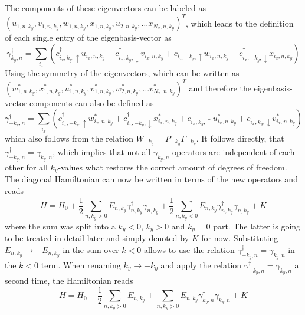The components of these eigenvectors can be labeled as $\left( u_{1,n,k_y}, v_{1,n,k_y}, w_{1,n,k_y}, x_{1,n,k_y}, u_{2,n,k_y}, \hdots x_{N_x,n,k_y}\right)^T$, which leads to the definition of each single entry of the eigenbasis-vector as
\begin{equation}
    \gamma^{\dag}_{k_y,n} = \sum_{i_x} \left( c^{\dag}_{i_x,k_y,\uparrow} u_{i_x,n,k_y} + c^{\dag}_{i_x,k_y,\downarrow}v_{i_x,n,k_y} + c_{i_x,-k_y,\uparrow} w_{i_x,n,k_y} + c^{\dag}_{i_x,-k_y,\downarrow} x_{i_x,n,k_y}\right)
\end{equation}
Using the symmetry of the eigenvectors, which can be written as \\ $\left( w^*_{1,n,k_y}, x^*_{1,n,k_y}, u^*_{1,n,k_y}, v^*_{1,n,k_y}, w^*_{2,n,k_y}, \hdots v^*_{N_x,n,k_y}\right)^T$ and therefore the eigenbasis-vector components can also be defined as 
\begin{equation}
    \gamma^{\dag}_{-k_y,n} = \sum_{i_x} \left( c^{\dag}_{i_x,-k_y,\uparrow} w^*_{i_x,n,k_y} + c^{\dag}_{i_x,-k_y,\downarrow} x^*_{i_x,n,k_y} + c_{i_x,k_y,\uparrow} u^*_{i_x,n,k_y} + c_{i_x,k_y,\downarrow} v^*_{i_x,n,k_y}\right) 
\end{equation}
which also follows from the relation $W_{-k_y} = P_{-k_y}\Gamma_{-k_y}$.
It follows directly, that $\gamma^{\dag}_{-k_y,n} = \gamma_{k_y,n}$, which implies that not all $\gamma_{k_y,n}$ operators are independent of each other for all $k_y$-values what restores the correct amount of degrees of freedom. \newline
The diagonal Hamiltonian can now be written in terms of the new operators and reads
\begin{equation} \nonumber
    H = H_0 + \frac{1}{2} \sum_{n,k_y>0} E_{n,k_y}\gamma^{\dag}_{n,k_y}\gamma_{n,k_y} + \frac{1}{2} \sum_{n,k_y<0} E_{n,k_y}\gamma^{\dag}_{n,k_y}\gamma_{n,k_y} + K
\end{equation}
where the sum was split into a $k_y<0$, $k_y>0$ and $k_y=0$ part.
The latter is going to be treated in detail later and simply denoted by $K$ for now.
Substituting $E_{n,k_y} \rightarrow -E_{n,k_y}$ in the sum over $k<0$ allows to use the relation $\gamma^{\dag}_{-k_y,n} = \gamma_{k_y,n}$ in the $k<0$ term.
When renaming $k_y \rightarrow -k_y$ and apply the relation $\gamma^{\dag}_{-k_y,n} = \gamma_{k_y,n}$ a second time, the Hamiltonian reads
\begin{equation} \nonumber
    H = H_0 -\frac{1}{2} \sum_{n, k_y >0} E_{n,k_y} + \sum_{n, k_y >0} E_{n,k_y}\gamma^{\dag}_{k_y,n}\gamma_{k_y,n} + K
\end{equation}
